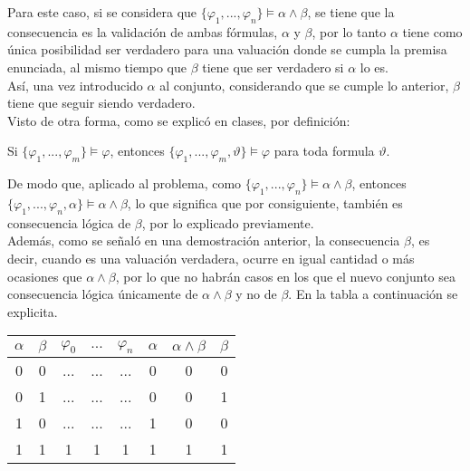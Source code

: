 \documentclass[letter]{article}
\begin{document}
\begin{pregunta}{2}
\begin{enumerate}
			Para este caso, si se considera que $\{\varphi_1, ..., \varphi_n\} \models \alpha \wedge \beta$, se tiene que la consecuencia es la validación de ambas fórmulas, $\alpha$ y $\beta$, por lo tanto $\alpha$ tiene como única posibilidad ser verdadero para una valuación donde se cumpla la premisa enunciada, al mismo tiempo que $\beta$ tiene que ser verdadero si $\alpha$ lo es.\\
			
			Así, una vez introducido $\alpha$ al conjunto, considerando que se cumple lo anterior, $\beta$ tiene que seguir siendo verdadero.\\
			
			Visto de otra forma, como se explicó en clases, por definición:
			
			\begin{center}
				Si $\{\varphi_1,...,\varphi_m\} \models \varphi$, entonces $\{\varphi_1,...,\varphi_m, \vartheta\} \models \varphi$ para toda formula $\vartheta$.
			\end{center}
			
			De modo que, aplicado al problema, como $\{\varphi_1, ..., \varphi_n\} \models \alpha \wedge \beta$, entonces $\{\varphi_1, ..., \varphi_n, \alpha\} \models \alpha \wedge \beta$, lo que significa que por consiguiente, también es consecuencia lógica de $\beta$, por lo explicado previamente.\\
			
			Además, como se señaló en una demostración anterior, la consecuencia $\beta$, es decir, cuando es una valuación verdadera, ocurre en igual cantidad o más ocasiones que $\alpha \wedge \beta$, por lo que no habrán casos en los que el nuevo conjunto sea consecuencia lógica únicamente de $\alpha \wedge \beta$ y no de $\beta$. En la tabla a continuación se explicita.
			
			\begin{center}
				\begin{tabular}{ cc|cccc|cc } 
				$\alpha$ & $\beta$ &$\varphi_0$ & $...$ & $\varphi_n$ & $\alpha$ & $\alpha \wedge \beta$ & $\beta$\\
				\hline
				0 & 0 & ... & ... & ... & 0 & 0 & 0\\
				0 & 1 & ... & ... & ... & 0 & 0 & 1\\
				1 & 0 & ... & ... & ... & 1 & 0 & 0\\
				\rowcolor{lightblue} 1 & 1 & 1 & 1 & 1 & 1 & 1 & 1\\
				\end{tabular}
			\end{center}
			

\end{enumerate}
\end{pregunta}
\end{document}
